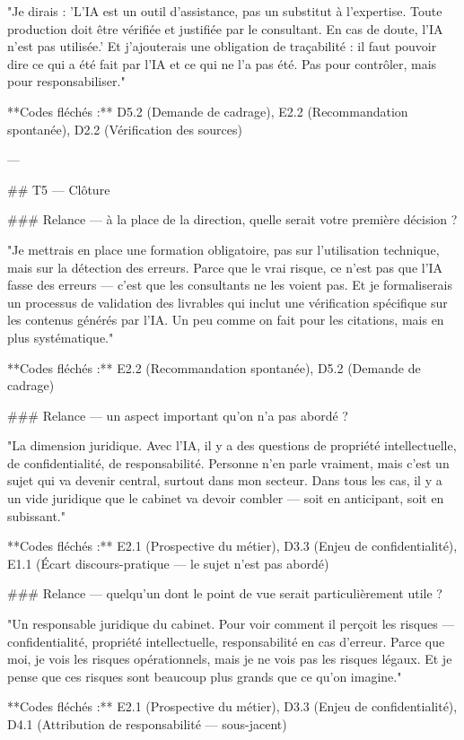 "Je dirais : 'L'IA est un outil d'assistance, pas un substitut à l'expertise. Toute production doit être vérifiée et justifiée par le consultant. En cas de doute, l'IA n'est pas utilisée.' Et j'ajouterais une obligation de traçabilité : il faut pouvoir dire ce qui a été fait par l'IA et ce qui ne l'a pas été. Pas pour contrôler, mais pour responsabiliser."

**Codes fléchés :** D5.2 (Demande de cadrage), E2.2 (Recommandation spontanée), D2.2 (Vérification des sources)

---

## T5 — Clôture

### Relance — à la place de la direction, quelle serait votre première décision ?

"Je mettrais en place une formation obligatoire, pas sur l'utilisation technique, mais sur la détection des erreurs. Parce que le vrai risque, ce n'est pas que l'IA fasse des erreurs — c'est que les consultants ne les voient pas. Et je formaliserais un processus de validation des livrables qui inclut une vérification spécifique sur les contenus générés par l'IA. Un peu comme on fait pour les citations, mais en plus systématique."

**Codes fléchés :** E2.2 (Recommandation spontanée), D5.2 (Demande de cadrage)

### Relance — un aspect important qu'on n'a pas abordé ?

"La dimension juridique. Avec l'IA, il y a des questions de propriété intellectuelle, de confidentialité, de responsabilité. Personne n'en parle vraiment, mais c'est un sujet qui va devenir central, surtout dans mon secteur. Dans tous les cas, il y a un vide juridique que le cabinet va devoir combler — soit en anticipant, soit en subissant."

**Codes fléchés :** E2.1 (Prospective du métier), D3.3 (Enjeu de confidentialité), E1.1 (Écart discours-pratique — le sujet n'est pas abordé)

### Relance — quelqu'un dont le point de vue serait particulièrement utile ?

"Un responsable juridique du cabinet. Pour voir comment il perçoit les risques — confidentialité, propriété intellectuelle, responsabilité en cas d'erreur. Parce que moi, je vois les risques opérationnels, mais je ne vois pas les risques légaux. Et je pense que ces risques sont beaucoup plus grands que ce qu'on imagine."

**Codes fléchés :** E2.1 (Prospective du métier), D3.3 (Enjeu de confidentialité), D4.1 (Attribution de responsabilité — sous-jacent)